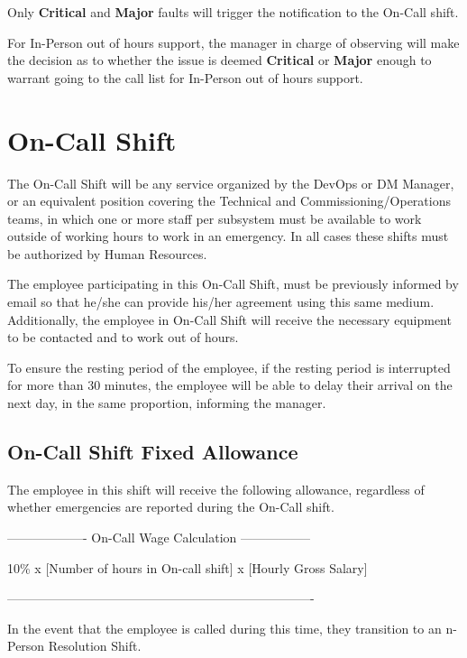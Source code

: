 Only \textbf{Critical} and \textbf{Major} faults will trigger the notification to the On-Call shift.

For In-Person out of hours support, the manager in charge of observing will make the decision as to whether the issue is deemed \textbf{Critical} or \textbf{Major} enough to warrant going to the call list for In-Person out of hours support.


\section{On-Call Shift}

The On-Call Shift will be any service organized by the DevOps or DM Manager, or an equivalent position covering the Technical and Commissioning/Operations teams, in which one or more staff per subsystem must be available to work outside of working hours to work in an emergency.
In all cases these shifts must be authorized by Human Resources.

The employee participating in this On-Call Shift, must be previously informed by email so that he/she can provide his/her agreement using this same medium. 
Additionally, the employee in On-Call Shift will receive the necessary equipment to be contacted and to work out of hours.

To ensure the resting period of the employee, if the resting period is interrupted for more than 30 minutes, the employee will be able to delay their arrival on the next day, in the same proportion, informing the manager.

\subsection{On-Call Shift Fixed Allowance}

The employee in this shift will receive the following allowance, regardless of whether emergencies are reported during the On-Call shift.

\begin{center} -------------------  On-Call Wage Calculation ----------------- \end{center}
10\% x [Number of hours in On-call shift] x [Hourly Gross Salary]
\begin{center} ------------------------------------------------------------------------- \end{center}

In the event that the employee is called during this time, they transition to an n-Person Resolution Shift.

